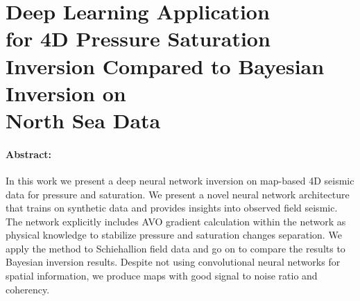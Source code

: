\section[Deep Learning Application for 4D Pressure Saturation Inversion Compared to Bayesian Inversion on North Sea Data]{Deep Learning Application\\for 4D Pressure Saturation Inversion Compared to Bayesian Inversion on\\North Sea Data}

\paragraph{Abstract:} In this work we present a deep neural network inversion on map-based 4D seismic data for pressure and saturation. We present a novel neural network architecture that trains on synthetic data and provides insights into observed field seismic. The network explicitly includes AVO gradient calculation within the network as physical knowledge to stabilize pressure and saturation changes separation. We apply the method to Schiehallion field data and go on to compare the results to Bayesian inversion results. Despite not using convolutional neural networks for spatial information, we produce maps with good signal to noise ratio and coherency.

{\vfill\hfill\newline{}}


